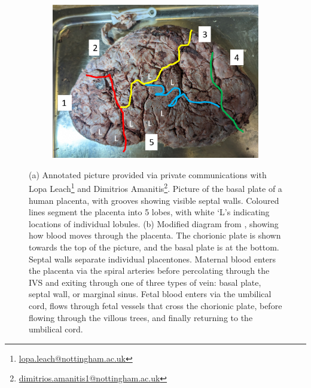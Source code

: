        \begin{figure}
            \centering
            \begin{subfigure}[b]{0.6\textwidth}
                \centering
                \includegraphics[width=\textwidth]{diagrams/real-placenta-pictures/placenta-lobules.png}
                \caption{}
                \label{fig:placenta:lobules}
            \end{subfigure}
            \hfill
            \begin{subfigure}[b]{\textwidth}
                \centering
                
                \caption{}
                \label{fig:placenta:cartoon}
            \end{subfigure}
            \caption{(a) Annotated picture provided via private communications with Lopa Leach\protect\footnote{\href{mailto:lopa.leach@nottingham.ac.uk}{lopa.leach@nottingham.ac.uk}} and Dimitrios Amanitis\protect\footnote{\href{mailto:dimitrios.amanitis1@nottingham.ac.uk}{dimitrios.amanitis1@nottingham.ac.uk}}. Picture of the basal plate of a human placenta, with grooves showing visible septal walls. Coloured lines segment the placenta into 5 lobes, with white `L's indicating locations of individual lobules. (b) Modified diagram from \cite{dellschaftHaemodynamicsHumanPlacenta2020}, showing how blood moves through the placenta. The chorionic plate is shown towards the top of the picture, and the basal plate is at the bottom. Septal walls separate individual placentones. Maternal blood enters the placenta via the spiral arteries before percolating through the IVS and exiting through one of three types of vein: basal plate, septal wall, or marginal sinus. Fetal blood enters via the umbilical cord, flows through fetal vessels that cross the chorionic plate, before flowing through the villous trees, and finally returning to the umbilical cord.}
            \label{fig:placenta}
        \end{figure}

